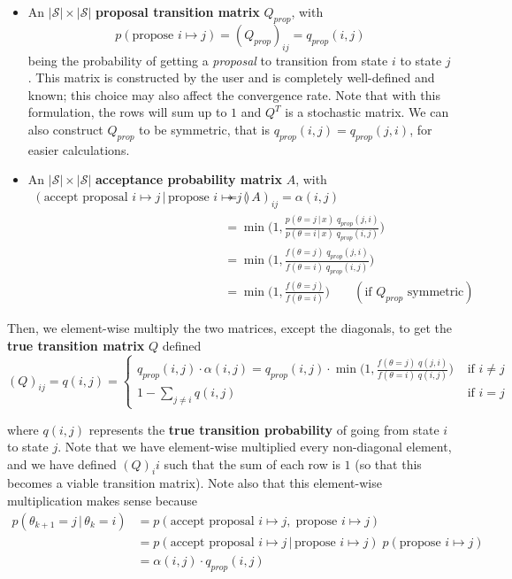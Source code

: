   \begin{itemize}
    \item An $|\mathcal{S}| \times |\mathcal{S}|$ \textbf{proposal transition matrix} $Q_{prop}$, with
    \begin{equation}
      p(\text{propose } i \mapsto j) = (Q_{prop})_{ij} = q_{prop} (i, j)
    \end{equation}
    being the probability of getting a \textit{proposal} to transition from state $i$ to state $j$. This matrix is constructed by the user and is completely well-defined and known; this choice may also affect the convergence rate. Note that with this formulation, the rows will sum up to $1$ and $Q^T$ is a stochastic matrix. We can also construct $Q_{prop}$ to be symmetric, that is $q_{prop}(i, j) = q_{prop} (j, i)$, for easier calculations.

    \item An $|\mathcal{S}| \times |\mathcal{S}|$ \textbf{acceptance probability matrix} $A$, with
    \begin{align*}
      (\text{accept proposal }i \mapsto j\,|\, \text{propose } i \mapsto j) & = (A)_{ij} = \alpha(i, j) \\
      & = \min \bigg(1, \frac{p(\theta = j \,|\, x)\; q_{prop}(j, i)}{p(\theta = i\,|\, x) \; q_{prop}(i, j)} \bigg) \\
      & = \min\bigg(1, \frac{f(\theta = j) \; q_{prop}(j, i)}{f(\theta = i) \; q_{prop}(i, j)} \bigg) \\
      & = \min\bigg(1, \frac{f(\theta = j)}{f(\theta = i)} \bigg) \;\;\;\;\;\;\; (\text{if } Q_{prop} \text{ symmetric})
    \end{align*}
  \end{itemize}

  Then, we element-wise multiply the two matrices, except the diagonals, to get the \textbf{true transition matrix} $Q$ defined
  \begin{equation}
    (Q)_{ij} = q(i, j) = \begin{cases}
      q_{prop} (i, j) \cdot \alpha (i, j) = q_{prop}(i, j) \cdot \min\bigg(1, \frac{f(\theta = j) \; q(j, i)}{f(\theta = i) \; q(i, j)} \bigg) & \text{ if } i \neq j \\
      1 - \sum_{j \neq i} q(i, j) & \text{ if } i = j
    \end{cases}
  \end{equation}

  where $q(i, j)$ represents the \textbf{true transition probability} of going from state $i$ to state $j$. Note that we have element-wise multiplied every non-diagonal element, and we have defined $(Q)_ii$ such that the sum of each row is $1$ (so that this becomes a viable transition matrix). Note also that this element-wise multiplication makes sense because
  \begin{align*}
    p(\theta_{k+1} = j\,|\, \theta_k = i) & = p(\text{accept proposal }i \mapsto j, \; \text{propose } i \mapsto j) \\
    & = p(\text{accept proposal }i \mapsto j\,|\, \text{propose } i \mapsto j)\; p(\text{propose } i \mapsto j) \\
    & = \alpha(i, j) \cdot q_{prop} (i, j)
  \end{align*}

